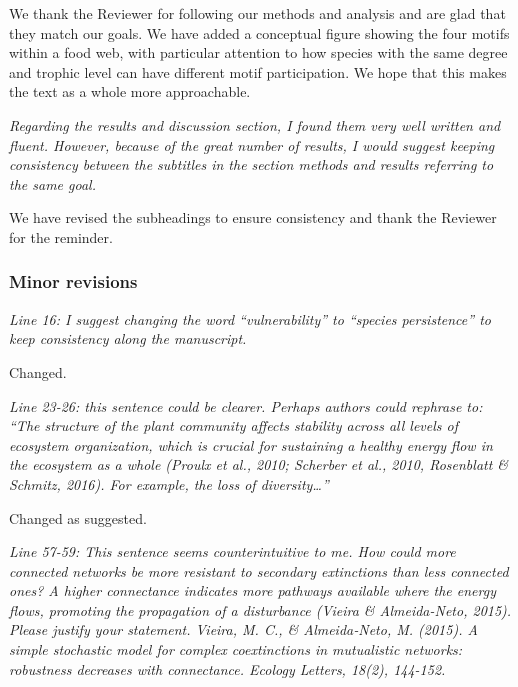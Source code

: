 \documentclass[12pt]{article}
\newcommand{\us}{\rm \setlength{\leftskip}{0.3cm} \setlength{\rightskip}{0.3cm}}
\newcommand{\them}{\it \setlength{\leftskip}{0cm} \setlength{\rightskip}{0cm}}
\begin{document}
    \us  We thank the Reviewer for following our methods and analysis and are glad that they match our goals. We have added a conceptual figure showing the four motifs within a food web, with particular attention to how species with the same degree and trophic level can have different motif participation. We hope that this makes the text as a whole more approachable.
    
    \them
    Regarding the results and discussion section, I found them very well written and fluent. However, because of the great number of results, I would suggest keeping consistency between the subtitles in the section methods and results referring to the same goal.
    
    \us We have revised the subheadings to ensure consistency and thank the Reviewer for the reminder.

    \subsubsection*{Minor revisions}

        \them
        Line 16: I suggest changing the word ``vulnerability'' to ``species persistence'' to keep consistency along the manuscript.
        
        \us
        Changed.
        
        \them
        Line 23-26: this sentence could be clearer. Perhaps authors could rephrase to: ``The structure of the plant community affects stability across all levels of ecosystem organization, which is crucial for sustaining a healthy energy flow in the ecosystem as a whole (Proulx et al., 2010; Scherber et al., 2010, Rosenblatt \& Schmitz, 2016). For example, the loss of diversity…''
        
        \us Changed as suggested.
        
        \them
        Line 57-59: This sentence seems counterintuitive to me. How could more connected networks be more resistant to secondary extinctions than less connected ones? A higher connectance indicates more pathways available where the energy flows, promoting the propagation of a disturbance (Vieira \& Almeida-Neto, 2015). Please justify your statement.
        Vieira, M. C., \& Almeida‐Neto, M. (2015). A simple stochastic model for complex coextinctions in mutualistic networks: robustness decreases with connectance. Ecology Letters, 18(2), 144-152.
        
\end{document}
